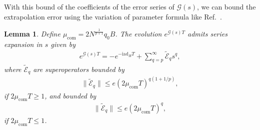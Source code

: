 \documentclass[11pt]{article}
\newtheorem{lemma}{Lemma}
\renewcommand{\i}{\mathrm{i}}
\newcommand{\ad}{\mathrm{ad}}
\newcommand{\G}{\mathcal{G}}
\newcommand{\E}{\mathcal{E}}
\newcommand{\com}{\mathrm{com}}
\begin{document}
With this bound of the coefficients of the error series of $\G(s)$, we can bound the extrapolation error using the variation of parameter formula like Ref.~\cite{aftab2024multi}. 
\begin{lemma}
    Define $\mu_{\com}=2N^{\frac{1}{p+1}}q_0B$. The evolution $e^{\G(s) T}$ admits series expansion in $s$ given by \begin{align*}
        e^{\G(s) T}=-e^{-\i \ad_H T}+ \sum_{q=p}^{\infty}\tilde{\E}_{q} s^q,
    \end{align*}
    where $\tilde{\E}_{q}$ are superoperators bounded by \begin{align*}
       \|\tilde{\E}_{q}\|\le   e(2\mu_{\com}T)^{q(1+1/p)},
    \end{align*}
    if $2\mu_{\com}T\ge 1$, and bounded by \begin{align*}
        \|\tilde{\E}_{q}\|\le e(2\mu_{\com}T)^{q},
    \end{align*}
    if $2\mu_{\com}T\le 1$.
\end{lemma}
\end{document}
